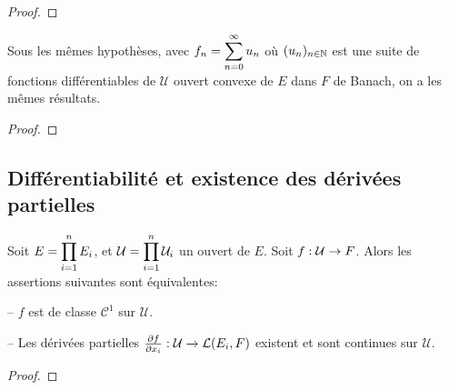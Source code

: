 \ifdefined\outputproof
\begin{proof}

\end{proof}
\fi

\begin{corollary}
	Sous les mêmes hypothèses, avec $f_{n} = \displaystyle \sum_{n = 0}^{\infty} u_{n}$ où
	$(u_{n})_{n \in \mathbb{N}}$ est une suite de fonctions différentiables de $\mathcal{U}$ ouvert
	convexe de $E$ dans $F$ de Banach, on a les mêmes résultats.
\end{corollary}

\ifdefined\outputproof
\begin{proof}

\end{proof}
\fi

\subsection{Différentiabilité et existence des dérivées partielles}

\begin{theorem}
\label{theorem_partial_derivative_existence}

	Soit $E = \displaystyle \prod_{i = 1}^{n} E_{i}$, et $\mathcal{U} =
	\displaystyle \prod_{i = 1}^{n} \mathcal{U}_{i}$ un ouvert de $E$.
	Soit $f : \mathcal{U} \rightarrow F$.
	Alors les assertions suivantes sont équivalentes:

	-- $f$ est de classe $\mathcal{C}^{1}$ sur $\mathcal{U}$.

	-- Les dérivées partielles
	$\pdv{f}{x_{i}} : \mathcal{U} \rightarrow \mathcal{L}(E_{i}, F)$
	existent et sont continues sur $\mathcal{U}$.
\end{theorem}

\ifdefined\outputproof
\begin{proof}

\end{proof}
\fi
